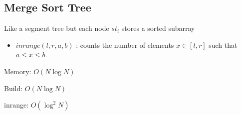 \subsection{Merge Sort Tree}

Like a segment tree but each node $st_i$ stores a sorted subarray


\begin{itemize}
  \item \textbf{$inrange(l, r, a, b)$} : counts the number of elements $x \in [l, r]$ such that $ a \leq x \leq b$.
\end{itemize}

Memory: $O(N \log N)$

Build: $O(N \log N)$

inrange: $O(\log^2 N)$
